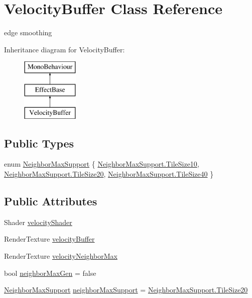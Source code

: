 \hypertarget{class_velocity_buffer}{}\section{Velocity\+Buffer Class Reference}
\label{class_velocity_buffer}


edge smoothing  


Inheritance diagram for Velocity\+Buffer\+:\begin{figure}[H]
\begin{center}
\leavevmode
\includegraphics[height=3.000000cm]{class_velocity_buffer}
\end{center}
\end{figure}
\subsection*{Public Types}
\begin{DoxyCompactItemize}
\item 
enum \mbox{\hyperlink{class_velocity_buffer_a2ab38673d716b1fe0286001d9545841a}{Neighbor\+Max\+Support}} \{ \mbox{\hyperlink{class_velocity_buffer_a2ab38673d716b1fe0286001d9545841aa98e0ce3c121a83857e055a5a8f6b83d4}{Neighbor\+Max\+Support.\+Tile\+Size10}}, 
\mbox{\hyperlink{class_velocity_buffer_a2ab38673d716b1fe0286001d9545841aa83363948170f4d30fa8409dde65992b4}{Neighbor\+Max\+Support.\+Tile\+Size20}}, 
\mbox{\hyperlink{class_velocity_buffer_a2ab38673d716b1fe0286001d9545841aa9404ba2f79e5361455b69f792f1c019d}{Neighbor\+Max\+Support.\+Tile\+Size40}}
 \}
\end{DoxyCompactItemize}
\subsection*{Public Attributes}
\begin{DoxyCompactItemize}
\item 
Shader \mbox{\hyperlink{class_velocity_buffer_aa0c5457f2493cd8818284bd347df8675}{velocity\+Shader}}
\item 
Render\+Texture \mbox{\hyperlink{class_velocity_buffer_a83972f10466377a2722cd251bfb73868}{velocity\+Buffer}}
\item 
Render\+Texture \mbox{\hyperlink{class_velocity_buffer_a7d00846a27b7a8b8121da962fa8cb0af}{velocity\+Neighbor\+Max}}
\item 
bool \mbox{\hyperlink{class_velocity_buffer_ab2c515700bb2c2c56d86d32ff654b6ba}{neighbor\+Max\+Gen}} = false
\item 
\mbox{\hyperlink{class_velocity_buffer_a2ab38673d716b1fe0286001d9545841a}{Neighbor\+Max\+Support}} \mbox{\hyperlink{class_velocity_buffer_aefa83034e3376b9ff4b675afca2677d3}{neighbor\+Max\+Support}} = \mbox{\hyperlink{class_velocity_buffer_a2ab38673d716b1fe0286001d9545841aa83363948170f4d30fa8409dde65992b4}{Neighbor\+Max\+Support.\+Tile\+Size20}}
\end{DoxyCompactItemize}
